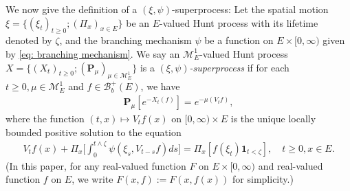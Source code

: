 \documentclass[12pt,a4paper]{amsart}
\theoremstyle{definition}
\numberwithin{equation}{section}
\begin{document}
We now give the definition of a $(\xi, \psi)$-superprocess:
Let the spatial motion 
$\xi=\{(\xi_t)_{t\geq 0};(\Pi_x)_{x\in E}\}$ be an $E$-valued Hunt process with its lifetime denoted by $\zeta$, and the branching mechanism $\psi$ be a function on $E\times[0,\infty)$ given by \eqref{eq: branching mechanism}.
We say an $\mathcal M^1_E$-valued Hunt process $X=\{(X_t)_{t\geq 0}; (\mathbf P_\mu)_{\mu \in \mathcal M^1_E}\}$ is a \emph{$(\xi,\psi)$-superprocess} if for each $t\geq 0, \mu \in \mathcal M_E^1$ and  $f\in \mathscr B^+_b(E)$, we have
\begin{align}
	\mathbf P_\mu [e^{-X_t(f)}] = e^{-\mu(V_tf)},
\end{align}
where the function $(t,x) \mapsto V_tf(x)$ on $[0,\infty) \times E$ is the unique locally bounded positive solution to the equation
\begin{align}\label{eq:FKPP_in_definition}
	V_t f(x) + \Pi_x \Big[  \int_0^{t\wedge \zeta} \psi (\xi_s,V_{t-s} f) ds \Big]
	= \Pi_x [ f(\xi_t)\mathbf 1_{t<\zeta} ],
	\quad t \geq 0, x \in E.
\end{align}
(In this paper, for any real-valued function $F$ on $E\times [0,\infty)$ and real-valued function $f$ on $E$, we write $F(x,f):= F(x,f(x))$ for simplicity.)
\end{document}
